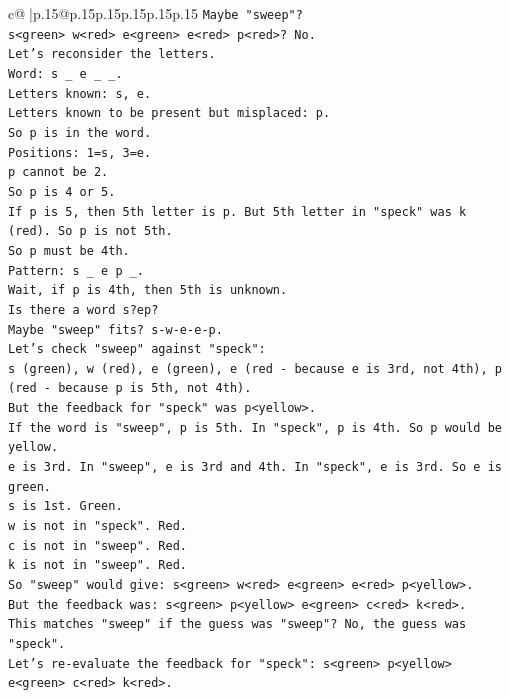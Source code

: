 \documentclass{article}
\begin{document}
{\begin{supertabular}{c@{$\;$}|p{.15\linewidth}@{}p{.15\linewidth}p{.15\linewidth}p{.15\linewidth}p{.15\linewidth}p{.15\linewidth}}
{{{\texttt{Maybe "sweep"?} \\
\texttt{s<green> w<red> e<green> e<red> p<red>? No.} \\
\texttt{Let's reconsider the letters.} \\
\texttt{Word: s \_ e \_ \_.} \\
\texttt{Letters known: s, e.} \\
\texttt{Letters known to be present but misplaced: p.} \\
\texttt{So p is in the word.} \\
\texttt{Positions: 1=s, 3=e.} \\
\texttt{p cannot be 2.} \\
\texttt{So p is 4 or 5.} \\
\texttt{If p is 5, then 5th letter is p. But 5th letter in "speck" was k (red). So p is not 5th.} \\
\texttt{So p must be 4th.} \\
\texttt{Pattern: s \_ e p \_.} \\
\texttt{Wait, if p is 4th, then 5th is unknown.} \\
\texttt{Is there a word s?ep?} \\
\texttt{Maybe "sweep" fits? s{-}w{-}e{-}e{-}p.} \\
\texttt{Let's check "sweep" against "speck":} \\
\texttt{s (green), w (red), e (green), e (red {-} because e is 3rd, not 4th), p (red {-} because p is 5th, not 4th).} \\
\texttt{But the feedback for "speck" was p<yellow>.} \\
\texttt{If the word is "sweep", p is 5th. In "speck", p is 4th. So p would be yellow.} \\
\texttt{e is 3rd. In "sweep", e is 3rd and 4th. In "speck", e is 3rd. So e is green.} \\
\texttt{s is 1st. Green.} \\
\texttt{w is not in "speck". Red.} \\
\texttt{c is not in "sweep". Red.} \\
\texttt{k is not in "sweep". Red.} \\
\texttt{So "sweep" would give: s<green> w<red> e<green> e<red> p<yellow>.} \\
\texttt{But the feedback was: s<green> p<yellow> e<green> c<red> k<red>.} \\
\texttt{This matches "sweep" if the guess was "sweep"? No, the guess was "speck".} \\
\texttt{Let's re{-}evaluate the feedback for "speck": s<green> p<yellow> e<green> c<red> k<red>.} \\
}}}
\end{supertabular}}
\end{document}
